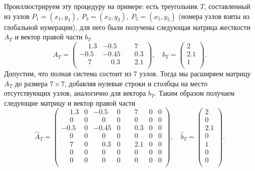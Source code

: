 \documentclass[12pt, a4paper]{article}
\begin{document}
				Проиллюстрируем эту процедуру на примере: есть треугольник $T$, составленный из узлов $P_1 = (x_1, y_1), \ P_3 = (x_3, y_3), \ P_5 = (x_5, y_5)$ (номера узлов взяты из глобальной нумерации), для него были получены следующая матрица жесткости $A_T$ и вектор правой части $b_T$
				\begin{equation*}
					A_T = \begin{pmatrix}
						\phantom{-}1.3 & -0.5 & \phantom{-}7 \\
						-0.5 & -0.45 & \phantom{-}0.3 \\
						\phantom{-}7 & \phantom{-}0.3 & \phantom{-}2.1 \\
					\end{pmatrix},
					\quad
					b_T = \begin{pmatrix}
						2 \\
						2.1 \\
						1 \\
					\end{pmatrix}.
				\end{equation*}
				Допустим, что полная система состоит из 7 узлов. Тогда мы расширяем матрицу $A_T$ до размера $7 \times 7$, добавляя нулевые строки и столбцы на место отсутствующих узлов, аналогично для вектора 
				$b_T$. Таким образом получаем следующие матрицу и вектор правой части
				\begin{equation*}
					\widehat A_T = 
					\begin{pmatrix}
						\phantom{-}1.3 & 0 & -0.5         & 0 & \phantom{-}7   & 0 & 0\\
						  \phantom{-}0 & 0 & \phantom{-}0 & 0 & \phantom{-}0   & 0 & 0\\
						          -0.5 & 0 & -0.45        & 0 & \phantom{-}0.3 & 0 & 0\\
						  \phantom{-}0 & 0 & \phantom{-}0 & 0 & \phantom{-}0   & 0 & 0\\
					   	  \phantom{-}7 & 0 &\phantom{-}0.3& 0 & \phantom{-}2.1 & 0 & 0\\
						  \phantom{-}0 & 0 & \phantom{-}0 & 0 & \phantom{-}0   & 0 & 0\\
						  \phantom{-}0 & 0 & \phantom{-}0 & 0 & \phantom{-}0   & 0 & 0\\
					\end{pmatrix},
					\quad
					\widehat{b}_T = \begin{pmatrix}
						2 \\
						0 \\
						2.1 \\
						0 \\
						1 \\
						0 \\
						0 \\
					\end{pmatrix}.
				\end{equation*}
				
\end{document}
